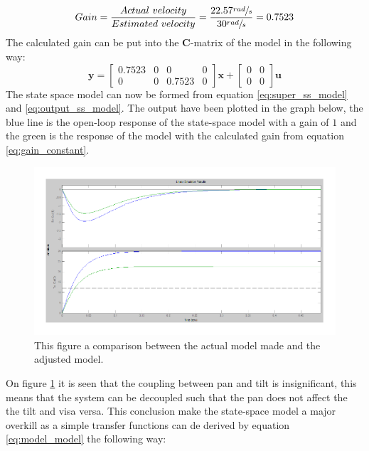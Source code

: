 \begin{equation}
	Gain = \frac{Actual\ velocity}{Estimated\ velocity} = \frac{22.57\sfrac{rad}{s}}{30\sfrac{rad}{s}} = 0.7523\label{eq:gain_constant}
\end{equation}
The calculated gain can be put into the \textbf{C}-matrix of the model in the following way:
\begin{equation}
 \textbf{y} =
 \begin{bmatrix}
   0.7523 & 0 & 0 & 0\\
   0 & 0 & 0.7523 & 0
 \end{bmatrix}
 \textbf{x} +
 \begin{bmatrix}
   0 & 0\\
   0 & 0
 \end{bmatrix}
 \textbf{u}\label{eq:output_ss_model}
\end{equation}
The state space model can now be formed from equation \ref{eq:super_ss_model} and \ref{eq:output_ss_model}. The output have been plotted in the graph below, the blue line is the open-loop response of the state-space model with a gain of $1$ and the green is the response of the model with the calculated gain from equation \ref{eq:gain_constant}.
\begin{figure}[htb]
	\begin{center}
	\includegraphics[scale=1,trim=0 0 0 0]{graphics/ZoomOpenLoop.pdf} %
	\caption{This figure a comparison between the actual model made and the adjusted model.}
	\label{fig:zoom_step}			%
	\end{center}
\end{figure}
On figure \ref{fig:zoom_step} it is seen that the coupling between pan and tilt is insignificant, this means that the system can be decoupled such that the pan does not affect the the tilt and visa versa. This conclusion make the state-space model a major overkill as a simple transfer functions can de derived by equation \ref{eq:model_model} the following way:
